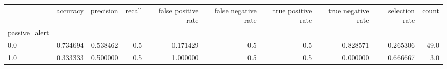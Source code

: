 \begin{tabular}{lrrrrrrrrr}
\toprule
{} &  accuracy &  precision &  recall &  false positive rate &  false negative rate &  true positive rate &  true negative rate &  selection rate &  count \\
passive\_alert &           &            &         &                      &                      &                     &                     &                 &        \\
\midrule
0.0           &  0.734694 &   0.538462 &     0.5 &             0.171429 &                  0.5 &                 0.5 &            0.828571 &        0.265306 &   49.0 \\
1.0           &  0.333333 &   0.500000 &     0.5 &             1.000000 &                  0.5 &                 0.5 &            0.000000 &        0.666667 &    3.0 \\
\bottomrule
\end{tabular}
